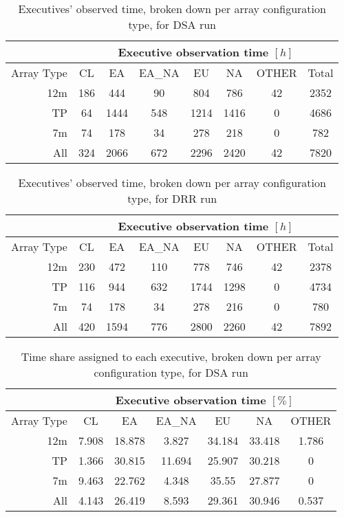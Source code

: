 \begin{table}[h!]
\centering
\begin{tabular}{c|c|c|c|c|c|c|c|} 
\cline{2-8}
 & \multicolumn{7}{c|}{Executive observation time $[h]$} \\ \hline
\multicolumn{1}{|r|}{Array Type} & CL	& EA & EA\_NA &	EU & NA & OTHER & Total \\ \hline
\multicolumn{1}{|r|}{12m} & 186 & 444 & 90 & 804 & 786 & 42 & 2352 \\ \hline
\multicolumn{1}{|r|}{TP} & 64 & 1444 & 548 & 1214 & 1416 & 0 & 4686 \\ \hline
\multicolumn{1}{|r|}{7m} & 74 & 178 & 34 & 278 & 218 & 0 & 782 \\ \hline
\multicolumn{1}{|r|}{All} & 324 & 2066 & 672 & 2296 & 2420 & 42 & 7820 \\ \hline
\end{tabular}
\caption{Executives' observed time, broken down per array configuration type, for DSA run}
\end{table}

\begin{table}[h!]
\centering
\begin{tabular}{c|c|c|c|c|c|c|c|} 
\cline{2-8}
 & \multicolumn{7}{c|}{Executive observation time $[h]$} \\ \hline
 \multicolumn{1}{|r|}{Array Type} & CL	& EA & EA\_NA &	EU & NA & OTHER & Total \\ \hline
 \multicolumn{1}{|r|}{12m} &	230 & 	472 &	110 &	778 & 	746 &	42 & 2378 \\ \hline
 \multicolumn{1}{|r|}{TP} & 116 & 944 & 632 &	1744 &	1298 & 	0 &	4734 \\ \hline
 \multicolumn{1}{|r|}{7m} & 74	& 178 & 34 & 278 & 216 & 0 & 780 \\ \hline
 \multicolumn{1}{|r|}{All} & 420 & 1594 & 776 & 2800 & 2260 & 42 & 7892 \\ \hline
\end{tabular}
\caption{Executives' observed time, broken down per array configuration type, for DRR run}
\end{table}

\begin{table}[h!]
\centering
\begin{tabular}{c|c|c|c|c|c|c|} 
\cline{2-7}
 & \multicolumn{6}{c|}{Executive observation time $[\%]$} \\ \hline
\multicolumn{1}{|r|}{Array Type} & CL	& EA & EA\_NA &	EU & NA & OTHER \\ \hline
\multicolumn{1}{|r|}{12m} & 7.908 & 18.878 & 3.827 & 34.184 & 33.418 & 1.786 \\ \hline
\multicolumn{1}{|r|}{TP} & 1.366 & 30.815 & 11.694 & 25.907 & 30.218 & 0 \\ \hline
\multicolumn{1}{|r|}{7m} & 9.463 & 22.762 & 4.348 & 35.55 & 27.877 & 0 \\ \hline
\multicolumn{1}{|r|}{All} & 4.143 & 26.419 & 8.593 & 29.361 & 30.946 & 0.537 \\ \hline
\end{tabular}
\caption{Time share assigned to each executive, broken down per array configuration type, for DSA run}
\end{table}

